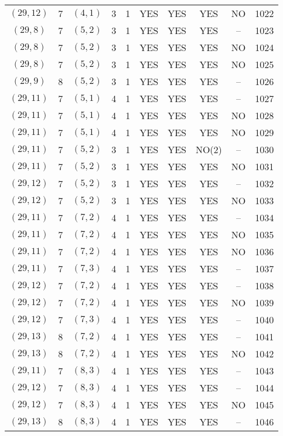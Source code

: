 \begin{longtable}{|c|c|c|c|c|c|c|c|c|c|}
$(29, 12)$ & 7 & $(4, 1)$ & 3 & 1 & YES & YES & YES & NO & 1022\\
$(29, 8)$ & 7 & $(5, 2)$ & 3 & 1 & YES & YES & YES & -- & 1023\\
$(29, 8)$ & 7 & $(5, 2)$ & 3 & 1 & YES & YES & YES & NO & 1024\\
$(29, 8)$ & 7 & $(5, 2)$ & 3 & 1 & YES & YES & YES & NO & 1025\\
$(29, 9)$ & 8 & $(5, 2)$ & 3 & 1 & YES & YES & YES & -- & 1026\\
$(29, 11)$ & 7 & $(5, 1)$ & 4 & 1 & YES & YES & YES & -- & 1027\\
$(29, 11)$ & 7 & $(5, 1)$ & 4 & 1 & YES & YES & YES & NO & 1028\\
$(29, 11)$ & 7 & $(5, 1)$ & 4 & 1 & YES & YES & YES & NO & 1029\\
$(29, 11)$ & 7 & $(5, 2)$ & 3 & 1 & YES & YES & NO(2) & -- & 1030\\
$(29, 11)$ & 7 & $(5, 2)$ & 3 & 1 & YES & YES & YES & NO & 1031\\
$(29, 12)$ & 7 & $(5, 2)$ & 3 & 1 & YES & YES & YES & -- & 1032\\
$(29, 12)$ & 7 & $(5, 2)$ & 3 & 1 & YES & YES & YES & NO & 1033\\
$(29, 11)$ & 7 & $(7, 2)$ & 4 & 1 & YES & YES & YES & -- & 1034\\
$(29, 11)$ & 7 & $(7, 2)$ & 4 & 1 & YES & YES & YES & NO & 1035\\
$(29, 11)$ & 7 & $(7, 2)$ & 4 & 1 & YES & YES & YES & NO & 1036\\
$(29, 11)$ & 7 & $(7, 3)$ & 4 & 1 & YES & YES & YES & -- & 1037\\
$(29, 12)$ & 7 & $(7, 2)$ & 4 & 1 & YES & YES & YES & -- & 1038\\
$(29, 12)$ & 7 & $(7, 2)$ & 4 & 1 & YES & YES & YES & NO & 1039\\
$(29, 12)$ & 7 & $(7, 3)$ & 4 & 1 & YES & YES & YES & -- & 1040\\
$(29, 13)$ & 8 & $(7, 2)$ & 4 & 1 & YES & YES & YES & -- & 1041\\
$(29, 13)$ & 8 & $(7, 2)$ & 4 & 1 & YES & YES & YES & NO & 1042\\
$(29, 11)$ & 7 & $(8, 3)$ & 4 & 1 & YES & YES & YES & -- & 1043\\
$(29, 12)$ & 7 & $(8, 3)$ & 4 & 1 & YES & YES & YES & -- & 1044\\
$(29, 12)$ & 7 & $(8, 3)$ & 4 & 1 & YES & YES & YES & NO & 1045\\
$(29, 13)$ & 8 & $(8, 3)$ & 4 & 1 & YES & YES & YES & -- & 1046\\

\end{longtable}
